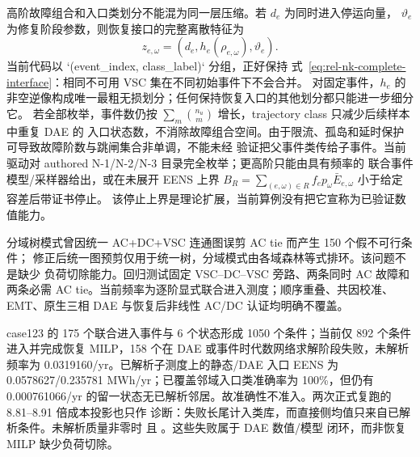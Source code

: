 高阶故障组合和入口类划分不能混为同一层压缩。若 $d_e$ 为同时进入停运向量，
$\vartheta_e$ 为修复阶段参数，则恢复接口的完整离散特征为
\begin{equation}
 z_{e,\omega}=(d_e,h_e(\rho_{e,\omega}),\vartheta_e).
 \label{eq:rel-nk-complete-interface}
\end{equation}
当前代码以 `(event_index, class_label)` 分组，正好保持
式~\eqref{eq:rel-nk-complete-interface}：相同不可用 VSC 集在不同初始事件下不会合并。
对固定事件，$h_e$ 的非空逆像构成唯一最粗无损划分；任何保持恢复入口的其他划分都只能进一步细分它。
若全部枚举，事件数仍按 $\sum_m\binom{n_u}{m}$ 增长，trajectory class 只减少后续样本中重复 DAE 的
入口状态数，不消除故障组合空间。由于限流、孤岛和延时保护可导致故障阶数与跳闸集合非单调，不能未经
验证把父事件类传给子事件。当前驱动对 authored N-1/N-2/N-3 目录完全枚举；更高阶只能由具有频率的
联合事件模型/采样器给出，或在未展开 EENS 上界
$B_R=\sum_{(e,\omega)\in R}f_ep_\omega\bar E_{e,\omega}$ 小于给定容差后带证书停止。
该停止上界是理论扩展，当前算例没有把它宣称为已验证数值能力。

分域树模式曾因统一 AC+DC+VSC 连通图误剪 AC tie 而产生 150 个假不可行条件；
修正后统一图预剪仅用于统一树，分域模式由各域森林等式排环。该问题不是缺少
负荷切除能力。回归测试固定 VSC--DC--VSC 旁路、两条同时 AC 故障和两条必需
AC tie。当前频率为逐阶显式联合进入测度；顺序重叠、共因校准、EMT、原生三相
DAE 与恢复后非线性 AC/DC 认证均明确不覆盖。

case123 的 175 个联合进入事件与 6 个状态形成 1050 个条件；当前仅 892 个条件
进入并完成恢复 MILP，158 个在 DAE 或事件时代数网络求解阶段失败，未解析频率为
0.0319160/yr。已解析子测度上的静态/DAE 入口 EENS 为
0.0578627/0.235781 MWh/yr；已覆盖邻域入口类准确率为 100\%，但仍有
0.000761066/yr 的留一状态无已解析邻居。故准确性不准入。两次正式复跑的 8.81--8.91 倍成本投影也只作
诊断：失败长尾计入类库，而直接侧均值只来自已解析条件。未解析质量非零时
 且
。这些失败属于 DAE 数值/模型
闭环，而非恢复 MILP 缺少负荷切除。

